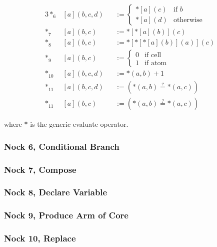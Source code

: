 \begin{alignat*}{3}
*_{6}&[a](b,c,d) &&:= \left\{ \begin{matrix} *[a](c) & \textrm{if } b \\ *[a](d) & \textrm{otherwise} \end{matrix} \right. \\
*_{7}&[a](b,c) &&:= *[*[a](b)](c) \\
*_{8}&[a](b,c) &&:= *[*[*[a](b)](a)](c) \\  %
*_{9}&[a](b,c) &&:= \left\{\begin{matrix} 0 & \text{if cell} \\ 1 & \text{if atom} \end{matrix} \right. \\
*_{10}&[a](b,c,d) &&:= {*(a,b) + 1} \\
*_{11}&[a](b,c,d) &&:= ({*(a,b)} \stackrel{?}{=} {*(a,c)}) \\
*_{11}&[a](b,c) &&:= ({*(a,b)} \stackrel{?}{=} {*(a,c)})
\end{alignat*}

where $*$ is the generic evaluate operator.

\subsubsection[Nock 6]{Nock 6, Conditional Branch}
\subsubsection[Nock 7]{Nock 7, Compose}
\subsubsection[Nock 8]{Nock 8, Declare Variable}
\subsubsection[Nock 9]{Nock 9, Produce Arm of Core}
\subsubsection[Nock 10]{Nock 10, Replace}
